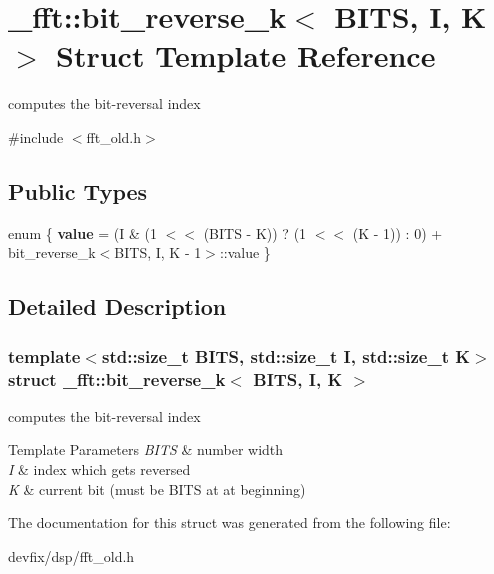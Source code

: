 \hypertarget{struct__fft_1_1bit__reverse__k}{}\section{\+\_\+fft\+:\+:bit\+\_\+reverse\+\_\+k$<$ B\+I\+TS, I, K $>$ Struct Template Reference}
\label{struct__fft_1_1bit__reverse__k}


computes the bit-\/reversal index  




{\ttfamily \#include $<$fft\+\_\+old.\+h$>$}

\subsection*{Public Types}
\begin{DoxyCompactItemize}
\item 
\mbox{\label{struct__fft_1_1bit__reverse__k_acec3a358f7a34042c6c22ccbafd7fd6f}} 
enum \{ {\bfseries value} = (I \& (1 $<$$<$ (B\+I\+TS -\/ K)) ? (1 $<$$<$ (K -\/ 1)) \+: 0) + bit\+\_\+reverse\+\_\+k$<$B\+I\+TS, I, K -\/ 1$>$\+:\+:value
 \}
\end{DoxyCompactItemize}


\subsection{Detailed Description}
\subsubsection*{template$<$std\+::size\+\_\+t B\+I\+TS, std\+::size\+\_\+t I, std\+::size\+\_\+t K$>$\newline
struct \+\_\+fft\+::bit\+\_\+reverse\+\_\+k$<$ B\+I\+T\+S, I, K $>$}

computes the bit-\/reversal index 


\begin{DoxyTemplParams}{Template Parameters}
{\em B\+I\+TS} & number width \\
\hline
{\em I} & index which gets reversed \\
\hline
{\em K} & current bit (must be B\+I\+TS at at beginning) \\
\hline
\end{DoxyTemplParams}


The documentation for this struct was generated from the following file\+:\begin{DoxyCompactItemize}
\item 
devfix/dsp/fft\+\_\+old.\+h\end{DoxyCompactItemize}
